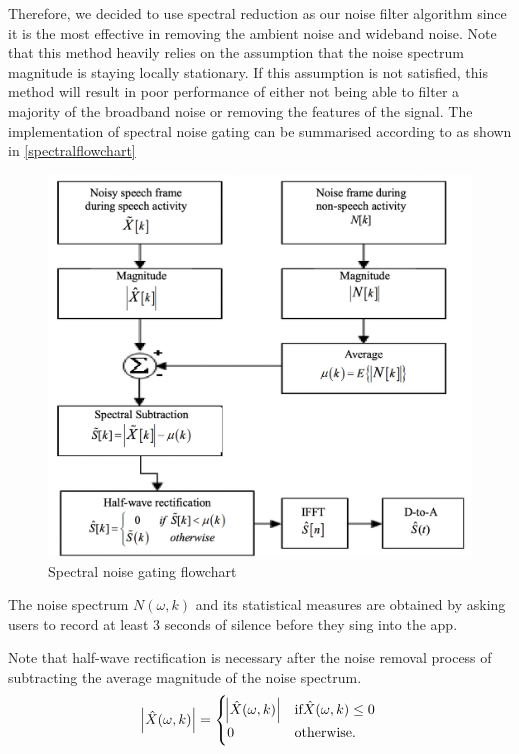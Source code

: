 Therefore, we decided to use spectral reduction as our noise filter algorithm since it is the most effective in removing the ambient noise 
and wideband noise. Note that this method heavily relies on the assumption that the noise spectrum magnitude is staying locally 
stationary. If this assumption is not satisfied, this method will result in poor performance of either not being able to filter a majority of 
the broadband noise or removing the features of the signal.
The implementation of spectral noise gating can be summarised according to \cite{spectralflowchart} as shown in \autoref{spectralflowchart}
\begin{figure}
	\centering
	\includegraphics[scale=0.35]{Figures/spectralprocess.png}
	\caption{Spectral noise gating flowchart}
	\label{spectralflowchart}
\end{figure}
The noise spectrum $N(\omega,k)$ and its statistical measures are obtained by asking users to record at least 3 seconds of silence 
before they sing into the app.

Note that half-wave rectification is necessary after the noise removal process of subtracting the average magnitude of the noise spectrum. 
\begin{equation}
    \abs{\hat{X}(\omega,k)} = \begin{cases}
        \abs{\hat{X}(\omega,k)}   & \text{if} \hat{X}(\omega,k) \leq 0\\
        0                     & \text{otherwise.}
    \end{cases}
\end{equation}

